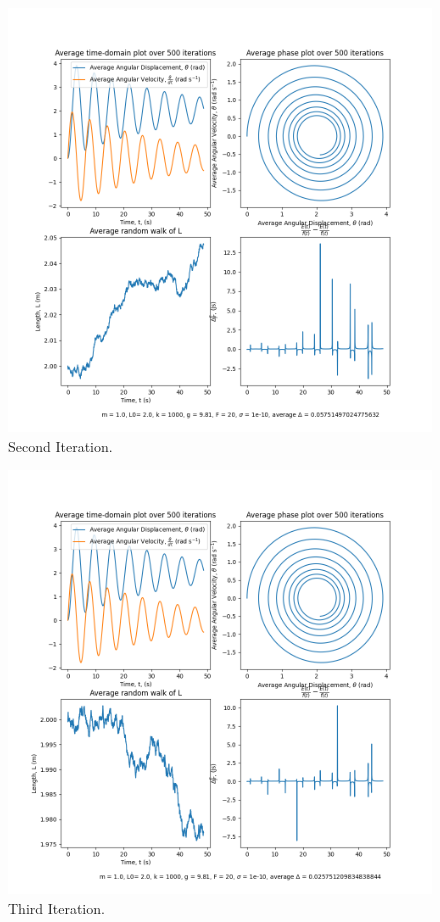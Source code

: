 \documentclass[10pt, twocolumn]{article}
\begin{document}
\begin{figure}
    \centering
    \includegraphics[width = \columnwidth]{Projects/ForcedSimplePendulum/Plots/m = 1.0, L0= 2.0, k = 1000, g = 9.81, F = 20, sigma = 1e-10, run number 1.png}
    \caption{Second Iteration.}
    \label{fig:enter-label}
\end{figure}

\begin{figure}
    \centering
    \includegraphics[width = \columnwidth]{Projects/ForcedSimplePendulum/Plots/m = 1.0, L0= 2.0, k = 1000, g = 9.81, F = 20, sigma = 1e-10, run number 2.png}
    \caption{Third Iteration.}
    \label{fig:enter-label}
\end{figure}
\end{document}
